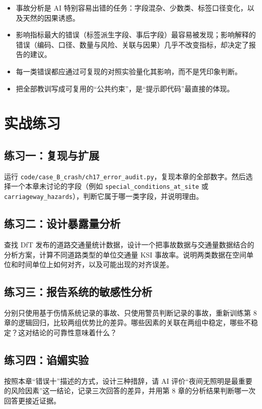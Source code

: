\begin{itemize}
  \item 事故分析是 AI 特别容易出错的任务：字段混杂、少数类、标签口径变化，以及天然的因果诱惑。
  \item 影响指标最大的错误（标签派生字段、事后字段）最容易被发现；影响解释的错误（编码、口径、数量与风险、关联与因果）几乎不改变指标，却决定了报告的建议。
  \item 每一类错误都应通过可复现的对照实验量化其影响，而不是凭印象判断。
  \item 把全部教训写成可复用的“公共约束”，是“提示即代码”最直接的体现。
\end{itemize}

\section{实战练习}

\subsection*{练习一：复现与扩展}

运行 \texttt{code/case\_B\_crash/ch17\_error\_audit.py}，复现本章的全部数字。然后选择一个本章未讨论的字段（例如 \texttt{special\_conditions\_at\_site} 或 \texttt{carriageway\_hazards}），判断它属于哪一类字段，并说明理由。

\subsection*{练习二：设计暴露量分析}

查找 DfT 发布的道路交通量统计数据，设计一个把事故数据与交通量数据结合的分析方案，计算不同道路类型的单位交通量 KSI 事故率。说明两类数据在空间单位和时间单位上如何对齐，以及可能出现的对齐误差。

\subsection*{练习三：报告系统的敏感性分析}

分别只使用基于伤情系统记录的事故、只使用警员判断记录的事故，重新训练第 8 章的逻辑回归，比较两组优势比的差异。哪些因素的关联在两组中稳定，哪些不稳定？这对结论的可靠性意味着什么？

\subsection*{练习四：谄媚实验}

按照本章“错误十”描述的方式，设计三种措辞，请 AI 评价“夜间无照明是最重要的风险因素”这一结论，记录三次回答的差异，并用第 8 章的分析结果判断哪一次回答更接近证据。
